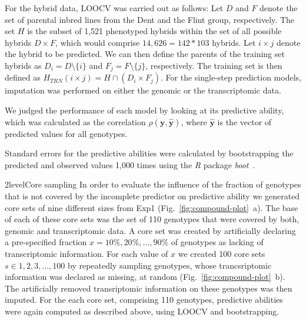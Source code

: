 \documentclass[12pt,titlepage]{article}
\begin{document}
For the hybrid data, LOOCV was carried out as follows:
Let $D$ and $F$ denote the set of parental inbred lines from the Dent and the 
Flint group, respectively.
The set $H$ is the subset of 1,521 phenotyped hybrids within the set of all
possible hybrids $D \times F$, which would comprise $14,626 = 142 * 103$
hybrids.
Let $i \times j$ denote the hybrid to be predicted.
We can then define the parents of the training set hybrids as
$D_{i} = D \setminus \{i\}$ and $F_{j} = F \setminus \{j\}$, respectively.
The training set is then defined as 
$H_{TRN}(i \times j) = H \cap (D_{i} \times F_{j})$.
For the single-step prediction models, imputation was performed on either the
genomic or the transcriptomic data.

We judged the performance of each model by looking at its predictive ability,
which was calculated as the correlation $\rho(\mathbf{y}, \mathbf{\hat{y}})$,
where $\mathbf{\hat{y}}$ is the vector of predicted values for all genotypes.

Standard errors for the predictive abilities were calculated by bootstrapping
the predicted and observed values 1,000 times using the \emph{R} package 
\emph{boot}~\cite{Canty2017}.



\Genetics2level{Core sampling}
In order to evaluate the influence of the fraction of genotypes that is not
covered by the incomplete predictor on predictive ability we generated core
sets of nine different sizes from Exp1 (Fig.~\ref{fig:compound-plot}~a).
The base of each of these core sets was the set of 110 genotypes that were
covered by both, genomic and transcriptomic data.
A core set was created by artificially declaring a pre-specified fraction 
$x = {10\%, 20\%, \dots, 90\%}$ of genotypes as lacking of transcriptomic 
information.
For each value of $x$ we created 100 core sets $s \in {1, 2, 3, \dots, 100}$ by
repeatedly sampling genotypes, whose trancsriptomic information was declared
as missing, at random (Fig.~\ref{fig:compound-plot}~b).
The artificially removed transriptomic information on these genotypes was then
imputed.
For the each core set, comprising 110 genotypes, predictive abilities were again
computed as described above, using LOOCV and bootstrapping.
\end{document}
